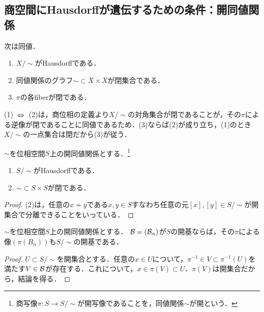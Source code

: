\documentclass[uplatex,dvipdfmx]{jsreport}
\begin{document}
\subsection{商空間にHausdorffが遺伝するための条件：開同値関係}

\begin{tcolorbox}[colframe=ForestGreen, colback=ForestGreen!10!white,breakable,colbacktitle=ForestGreen!40!white,coltitle=black,fonttitle=\bfseries\sffamily,
title=]
    次は同値．
    \begin{enumerate}
        \item $X/\sim$がHausdorffである．
        \item 同値関係のグラフ$\sim\subset X\times X$が閉集合である．
        \item $\pi$の各fiberが閉である．
    \end{enumerate}
    (1)$\;\;\Leftrightarrow\;\;$(2)は，商位相の定義より$X/\sim$の対角集合が閉であることが，その$\pi$による逆像が閉であることに同値であるため．(3)ならば(2)が成り立ち，(1)のとき$X/\sim$の一点集合は閉だから(3)が従う．
\end{tcolorbox}

\begin{theorem}\label{thm-characterization-of-quotient-Hausdorff}
    $\sim$を位相空間$S$上の開同値関係とする．\footnote{商写像$\pi:S\to S/\sim$が開写像であることを，同値関係$\sim$が開という．}
    \begin{enumerate}
        \item $S/\sim$がHausdorffである．
        \item $\sim\subset S\times S$が閉である．
    \end{enumerate}
\end{theorem}
\begin{proof}
    (2)は，任意の$x\not\sim y$である$x,y\in S$すなわち任意の元$[x],[y]\in S/\sim$が開集合で分離できることをいっている．
\end{proof}

\begin{theorem}
    $\sim$を位相空間$S$上の開同値関係とする．
    $\mathcal{B}=(\mathcal{B}_\alpha)$が$S$の開基ならば，その$\pi$による像$(\pi(B_\alpha))$も$S/\sim$の開基である．
\end{theorem}
\begin{proof}
    $U\subset S/\sim$を開集合とする．任意の$x\in U$について，$\pi^{-1}\in V\subset\pi^{-1}(U)$を満たす$V\in\mathcal{B}$が存在する．これについて，$x\in\pi(V)\subset U$．$\pi(V)$は開集合だから，結論を得る．
\end{proof}
\end{document}
